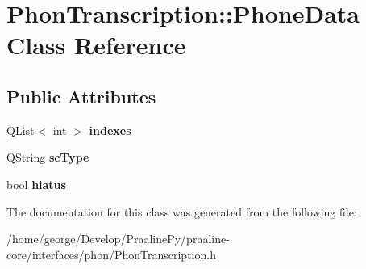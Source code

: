\hypertarget{class_phon_transcription_1_1_phone_data}{}\section{Phon\+Transcription\+:\+:Phone\+Data Class Reference}
\label{class_phon_transcription_1_1_phone_data}
\subsection*{Public Attributes}
\begin{DoxyCompactItemize}
\item 
\mbox{\label{class_phon_transcription_1_1_phone_data_a059d655acaff6cee184a598cd9499ed9}} 
Q\+List$<$ int $>$ {\bfseries indexes}
\item 
\mbox{\label{class_phon_transcription_1_1_phone_data_a48a8f4017d47f1d691995f81605ae079}} 
Q\+String {\bfseries sc\+Type}
\item 
\mbox{\label{class_phon_transcription_1_1_phone_data_a7a4c91f6aa9c69a2a1451b9f62b87ce9}} 
bool {\bfseries hiatus}
\end{DoxyCompactItemize}


The documentation for this class was generated from the following file\+:\begin{DoxyCompactItemize}
\item 
/home/george/\+Develop/\+Praaline\+Py/praaline-\/core/interfaces/phon/Phon\+Transcription.\+h\end{DoxyCompactItemize}
